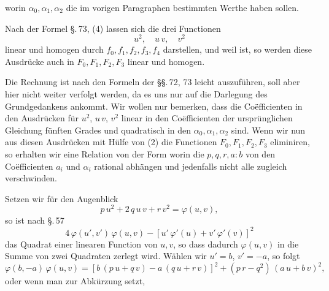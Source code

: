 worin $\alpha_0, \alpha_1, \alpha_2$ die im vorigen Paragraphen bestimmten Werthe haben sollen.

Nach der Formel \S.\,73, (4) lassen sich die drei Functionen
\[
u^2, \quad u\,v, \quad v^2
\]
linear und homogen durch $f_0, f_1, f_2, f_3, f_4$ darstellen, und weil
ist, so werden diese Ausdr\"ucke auch in $F_0, F_1, F_2, F_3$ linear und homogen.

Die Rechnung ist nach den Formeln der \S\S.\,72, 73 leicht auszuf\"uhren, soll aber hier nicht weiter verfolgt werden, da es uns nur auf die Darlegung des Grundgedankens ankommt. Wir wollen nur bemerken, dass die Co\"efficienten in den Ausdr\"ucken f\"ur $u^2$, $u\,v$, $v^2$ linear in den Co\"efficienten der urspr\"unglichen Gleichung f\"unften Grades und quadratisch in den $\alpha_0, \alpha_1, \alpha_2$ sind. Wenn wir nun aus diesen Ausdr\"ucken mit H\"ulfe von (2) die Functionen $F_0, F_1, F_2, F_3$ eliminiren, so erhalten wir eine Relation von der Form
worin die $p, q, r, a: b$ von den Co\"efficienten $a_i$ und $\alpha_i$ rational abh\"angen und jedenfalls nicht alle zugleich verschwinden.

Setzen wir f\"ur den Augenblick
\[
p\,u^2 + 2\,q\,u\,v + r\,v^2 = \varphi(u,v),
\]
so ist nach \S.\,57
\[
4\,\varphi(u',v')\,\varphi(u,v) - [u'\,\varphi'(u) + v'\,\varphi'(v)]^2
\]
das Quadrat einer linearen Function von $u, v$, so dass dadurch $\varphi(u,v)$ in die Summe von zwei Quadraten zerlegt wird. W\"ahlen wir $u' = b$, $v' = -a$, so folgt
\[
\varphi(b,-a)\,\varphi(u,v) = [b\,(p\,u + q\,v) - a\,(q\,u + r\,v)]^2 + (p\,r - q^2)\,(a\,u + b\,v)^2,
\]
oder wenn man zur Abk\"urzung
setzt,
